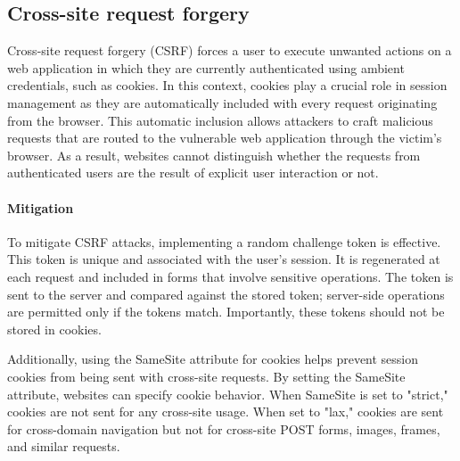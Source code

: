 \subsection{Cross-site request forgery}
Cross-site request forgery (CSRF) forces a user to execute unwanted actions on a web application in which they are currently authenticated using ambient credentials, such as cookies. 
In this context, cookies play a crucial role in session management as they are automatically included with every request originating from the browser. 
This automatic inclusion allows attackers to craft malicious requests that are routed to the vulnerable web application through the victim's browser. 
As a result, websites cannot distinguish whether the requests from authenticated users are the result of explicit user interaction or not.

\paragraph*{Mitigation}
To mitigate CSRF attacks, implementing a random challenge token is effective. 
This token is unique and associated with the user's session. 
It is regenerated at each request and included in forms that involve sensitive operations. 
The token is sent to the server and compared against the stored token; server-side operations are permitted only if the tokens match. 
Importantly, these tokens should not be stored in cookies.

Additionally, using the SameSite attribute for cookies helps prevent session cookies from being sent with cross-site requests.
By setting the SameSite attribute, websites can specify cookie behavior. 
When SameSite is set to "strict," cookies are not sent for any cross-site usage. 
When set to "lax," cookies are sent for cross-domain navigation but not for cross-site POST forms, images, frames, and similar requests.